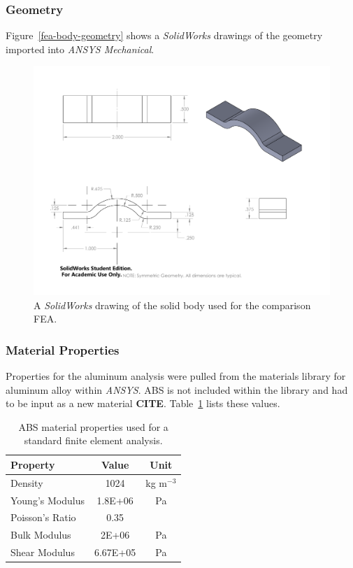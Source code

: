 \subsubsection{Geometry}

Figure~\ref{fea-body-geometry} shows a \emph{SolidWorks} drawings of the geometry imported into \emph{ANSYS Mechanical}.

\begin{figure}[htp]
\centering
\includegraphics[width=1\textwidth]{./figures/fea/fea-body-geometry}
\caption{A \emph{SolidWorks} drawing of the solid body used for the comparison FEA.}
\label{fig:fea-body-geometry}
\end{figure}

\clearpage

\subsubsection{Material Properties}

\indent

Properties for the aluminum analysis were pulled from the materials library for aluminum alloy within \emph{ANSYS}. ABS is not included within the library and had to be input as a new material \large{\textbf{CITE}}. Table~\ref{tab:abs-properties} lists these values.\\

\begin{table}[htp]
    \centering
    \begin{tabular}{lcc}
        Property & Value & Unit \\ \hline
        
        Density & 1024 & kg m$^{-3}$\\ 
        Young's Modulus & 1.8E+06 & Pa\\
        Poisson's Ratio & 0.35 & \\
        Bulk Modulus & 2E+06 & Pa \\
        Shear Modulus & 6.67E+05 & Pa\\
        
    \end{tabular}
    \caption{ABS material properties used for a standard finite element analysis.}
    \label{tab:abs-properties}
\end{table}

